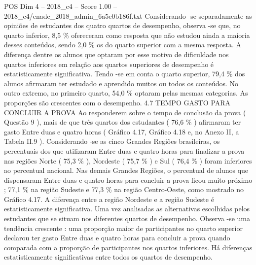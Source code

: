 \begin{textsample}{POS Dim 4 – 2018\_c4 – Score 1.00 – 2018\_c4/enade\_2018\_admin\_6a5e0b186f.txt}
Considerando -se separadamente as opiniões de estudantes dos quatro quartos de desempenho, observa -se que, no quarto inferior, 8,5 \% ofereceram como resposta que não estudou ainda a maioria desses conteúdos, sendo 2,0 \% os do quarto superior com a mesma resposta.
A diferença dentre os alunos que optaram por esse motivo de dificuldade nos quartos inferiores em relação aos quartos superiores de desempenho é estatisticamente significativa.
Tendo -se em conta o quarto superior, 79,4 \% dos alunos afirmaram ter estudado e aprendido muitos ou todos os conteúdos.
No outro extremo, no primeiro quarto, 54,0 \% optaram pelas mesmas categorias.
As proporções são crescentes com o desempenho. 4.7 TEMPO GASTO PARA CONCLUIR A PROVA Ao responderem sobre o tempo de conclusão da prova ( Questão 9 ), mais de que três quartos dos estudantes ( 76,6 \% ) afirmaram ter gasto Entre duas e quatro horas ( Gráfico 4.17, Gráfico 4.18 e, no Anexo II, a Tabela II.9 ).
Considerando -se as cinco Grandes Regiões brasileiras, os percentuais dos que utilizaram Entre duas e quatro horas para finalizar a prova nas regiões Norte ( 75,3 \% ), Nordeste ( 75,7 \% ) e Sul ( 76,4 \% ) foram inferiores ao percentual nacional.
Nas demais Grandes Regiões, o percentual de alunos que dispensaram Entre duas e quatro horas para concluir a prova ficou muito próximo ; 77,1 \% na região Sudeste e 77,3 \% na região Centro-Oeste, como mostrado no Gráfico 4.17.
A diferença entre a região Nordeste e a região Sudeste é estatisticamente significativa.
Uma vez analisadas as alternativas escolhidas pelos estudantes que se situam nos diferentes quartos de desempenho.
Observa -se uma tendência crescente : uma proporção maior de participantes no quarto superior declarou ter gasto Entre duas e quatro horas para concluir a prova quando comparada com a proporção de participantes nos quartos inferiores.
Há diferenças estatisticamente significativas entre todos os quartos de desempenho.

\end{textsample}
